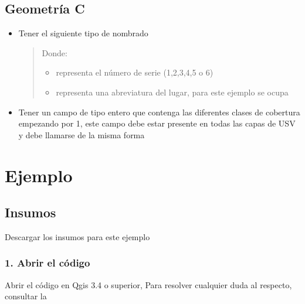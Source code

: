 \documentclass[letterpaper,10pt,spanish]{sphinxmanual}
\begin{document}
\subsection{Geometría C}
\label{\detokenize{nivel_geometrias:geometria-c}}\begin{itemize}
\item {} 
Tener el siguiente tipo de nombrado
\begin{quote}


Donde:
\begin{itemize}
\item {} 
\sphinxstylestrong{\#} representa el número de serie (1,2,3,4,5 o 6) 

\item {} 
 representa una abreviatura del lugar, para este ejemplo se ocupa  

\end{itemize}
\end{quote}

\item {} 
Tener un campo de tipo entero que contenga las diferentes clases de cobertura empezando por 1, este campo debe estar presente en todas las capas de USV y debe llamarse de la misma forma

\end{itemize}


\section{Ejemplo}
\label{\detokenize{nivel_geometrias:ejemplo}}

\subsection{Insumos}
\label{\detokenize{nivel_geometrias:insumos}}
Descargar los insumos para este ejemplo 


\subsubsection{1. Abrir el código}
\label{\detokenize{nivel_geometrias:abrir-el-codigo}}
Abrir el código  en Qgis 3.4 o superior,
Para resolver cualquier duda al respecto, consultar la 
\end{document}
